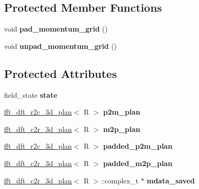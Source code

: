 \subsection*{Protected Member Functions}
\begin{DoxyCompactItemize}
\item 
\hypertarget{classfield_a80741dda39b5efb7243d963bcb95dcca}{
void {\bfseries pad\_\-momentum\_\-grid} ()}
\label{classfield_a80741dda39b5efb7243d963bcb95dcca}

\item 
\hypertarget{classfield_a5a0acbcd951734bcc335b7925d8b69f2}{
void {\bfseries unpad\_\-momentum\_\-grid} ()}
\label{classfield_a5a0acbcd951734bcc335b7925d8b69f2}

\end{DoxyCompactItemize}
\subsection*{Protected Attributes}
\begin{DoxyCompactItemize}
\item 
\hypertarget{classfield_a0339f4775135e5eb7670b51fab6362d7}{
field\_\-state {\bfseries state}}
\label{classfield_a0339f4775135e5eb7670b51fab6362d7}

\item 
\hypertarget{classfield_abf982d33a1c406b4eb1f4c8c467ecf11}{
\hyperlink{classfft__dft__r2c__3d__plan}{fft\_\-dft\_\-r2c\_\-3d\_\-plan}$<$ R $>$ {\bfseries p2m\_\-plan}}
\label{classfield_abf982d33a1c406b4eb1f4c8c467ecf11}

\item 
\hypertarget{classfield_a22253ddf5199719f8d8dcd01247710ca}{
\hyperlink{classfft__dft__c2r__3d__plan}{fft\_\-dft\_\-c2r\_\-3d\_\-plan}$<$ R $>$ {\bfseries m2p\_\-plan}}
\label{classfield_a22253ddf5199719f8d8dcd01247710ca}

\item 
\hypertarget{classfield_a8e03a1aa26e2cf8030907656730da254}{
\hyperlink{classfft__dft__r2c__3d__plan}{fft\_\-dft\_\-r2c\_\-3d\_\-plan}$<$ R $>$ {\bfseries padded\_\-p2m\_\-plan}}
\label{classfield_a8e03a1aa26e2cf8030907656730da254}

\item 
\hypertarget{classfield_ab27e5897e1ad678ad2168862a1c97ca6}{
\hyperlink{classfft__dft__c2r__3d__plan}{fft\_\-dft\_\-c2r\_\-3d\_\-plan}$<$ R $>$ {\bfseries padded\_\-m2p\_\-plan}}
\label{classfield_ab27e5897e1ad678ad2168862a1c97ca6}

\item 
\hypertarget{classfield_a36ec9091d81140d37552b1d6ef673e8c}{
\hyperlink{classfft__dft__c2r__3d__plan}{fft\_\-dft\_\-c2r\_\-3d\_\-plan}$<$ R $>$::complex\_\-t $\ast$ {\bfseries mdata\_\-saved}}
\label{classfield_a36ec9091d81140d37552b1d6ef673e8c}

\end{DoxyCompactItemize}


